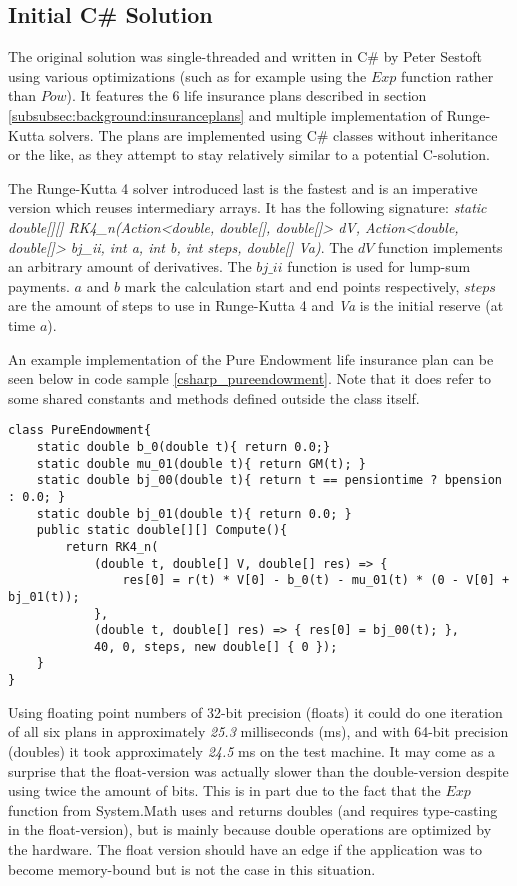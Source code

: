 \subsection{Initial C\# Solution}
The original solution was single-threaded and written in C\# by Peter Sestoft using various optimizations (such as for example using the $Exp$ function rather than $Pow$).
It features the 6 life insurance plans described in section \ref{subsubsec:background:insuranceplans} and multiple implementation of Runge-Kutta solvers.
The plans are implemented using C\# classes without inheritance or the like, as they attempt to stay relatively similar to a potential C-solution.

The Runge-Kutta 4 solver introduced last is the fastest and is an imperative version which reuses intermediary arrays.
It has the following signature: \textit{static double[][] RK4\_n(Action\textless{}double, double[], double[]\textgreater{} dV, Action\textless{}double, double[]\textgreater{} bj\_ii, int a, int b, int steps, double[] Va)}.
The $dV$ function implements an arbitrary amount of derivatives.
The $bj\_ii$ function is used for lump-sum payments.
$a$ and $b$ mark the calculation start and end points respectively, $steps$ are the amount of steps to use in Runge-Kutta 4 and \textit{Va} is the initial reserve (at time $a$).

An example implementation of the Pure Endowment life insurance plan can be seen below in code sample \ref{csharp_pureendowment}. 
Note that it does refer to some shared constants and methods defined outside the class itself.

\begin{lstlisting}[language=CSharp, caption=The pure endowment insurance plan expressed in C\#, label=csharp_pureendowment]
class PureEndowment{
    static double b_0(double t){ return 0.0;}
    static double mu_01(double t){ return GM(t); }
    static double bj_00(double t){ return t == pensiontime ? bpension : 0.0; }
    static double bj_01(double t){ return 0.0; }
    public static double[][] Compute(){
        return RK4_n(
            (double t, double[] V, double[] res) => { 
                res[0] = r(t) * V[0] - b_0(t) - mu_01(t) * (0 - V[0] + bj_01(t)); 
            },
            (double t, double[] res) => { res[0] = bj_00(t); },
            40, 0, steps, new double[] { 0 });
    }
}
\end{lstlisting}

Using floating point numbers of 32-bit precision (floats) it could do one iteration of all six plans in approximately \emph{25.3} milliseconds (ms), and with 64-bit precision (doubles) it took approximately \emph{24.5} ms on the test machine.
It may come as a surprise that the float-version was actually slower than the double-version despite using twice the amount of bits.
This is in part due to the fact that the $Exp$ function from System.Math uses and returns doubles (and requires type-casting in the float-version), but is mainly because double operations are optimized by the hardware\cite{northrup2008mcts}.
The float version should have an edge if the application was to become memory-bound but is not the case in this situation.